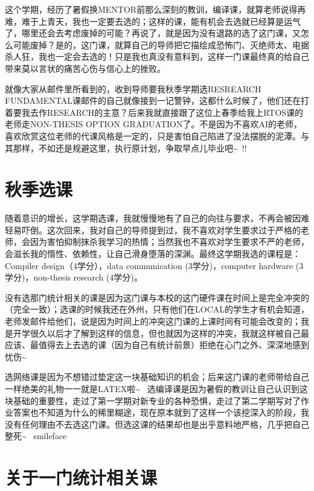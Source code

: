 \documentclass[12pt]{book}
\begin{document}
这个学期，经历了暑假换MENTOR前那么深刻的教训，编译课，就算老师说得再难，难于上青天，我也一定要去选的；这样的课，能有机会去选就已经算是运气了，哪里还会去考虑废掉的可能？再说了，就是因为没有退路的选了这门课，又怎么可能废掉？是的，这门课，就算自己的导师把它描绘成恐怖门、灭绝师太、电据杀人狂，我也一定会去选的！只是我也真没有意料到，这样一门课最终真的给自己带来莫以言状的痛苦心伤与信心上的挫败。

就像大家从邮件里所看到的，收到导师要我秋季学期选RESREARCH　FUNDAMENTAL课邮件的自己就像接到一记警钟，这都什么时候了，他们还在打着要我去作RESEARCH的主意？后来我就直接跟了这位上春季给我上RTOS课的老师走NON-THESIS OPTION GRADUATION了。不是因为不喜欢AI的老师，喜欢欣赏这位老师的代课风格是一定的，只是害怕自己陷进了没法摆脱的泥潭。与其那样，不如还是规避这里，执行原计划，争取早点儿毕业吧\textasciitilde{}~!!

\chapter{秋季选课}
\label{sec-11}

随着意识的增长，这学期选课，我就慢慢地有了自己的向往与要求，不再会被因难轻易吓倒。这次回来，我对自己的导师提到过，我不喜欢对学生要求过于严格的老师，会因为害怕抑制抹杀我学习的热情；当然我也不喜欢对学生要求不严的老师，会滋长我的惰性、依赖性，让自己滑身堕落的深渊。最终这学期我选的课程是：Compiler design（4学分），data communication (3学分)，computer hardware (3学分)，non-thesis research (4学分)。

没有选那门统计相关的课是因为这门课与本校的这门硬件课在时间上是完全冲突的（完全一致）；选课的时候我还在外州，只有他们在LOCAL的学生才有机会知道，老师发邮件给他们，说是因为时间上的冲突这门课的上课时间有可能会改变的；我是开学很久以后才了解到这样的信息，但也就因为这样的冲突，我就这样被自己最应该、最值得去上去选的课（因为自己有统计前景）拒绝在心门之外、深深地感到忧伤\textasciitilde{}~

选网络课是因为不想错过垫定这一块基础知识的机会；后来这门课的老师带给自己一样绝美的礼物一一就是LATEX啦\textasciitilde{}~ 选编译课是因为暑假的教训让自己认识到这块基础的重要性，走过了第一学期对新专业的各种恐惧，走过了第二学期写对了作业答案也不知道为什么的稀里糊途，现在原本就到了这样一个该挖深入的阶段，我没有任何理由不去选这门课。但选这课的结果却也是出乎意料地严格，几乎把自己整死\textasciitilde{}~ smileface

\chapter{关于一门统计相关课}
\label{sec-12}
\end{document}
